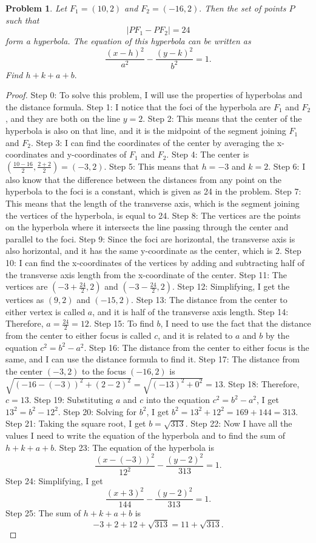\documentclass{article}
\newtheorem{theorem}{Problem}
\begin{document}
\begin{theorem}
Let $F_1 = (10,2)$ and $F_ 2= (-16,2).$ Then the set of points $P$ such that\[|PF_1 - PF_2| = 24\]form a hyperbola. The equation of this hyperbola can be written as\[\frac{(x - h)^2}{a^2} - \frac{(y - k)^2}{b^2} = 1.\]Find $h + k + a + b.$
\end{theorem}

\begin{proof}
Step 0: To solve this problem, I will use the properties of hyperbolas and the distance formula.
Step 1: I notice that the foci of the hyperbola are $F_1$ and $F_2$, and they are both on the line $y = 2.$
Step 2: This means that the center of the hyperbola is also on that line, and it is the midpoint of the segment joining $F_1$ and $F_2.$
Step 3: I can find the coordinates of the center by averaging the x-coordinates and y-coordinates of $F_1$ and $F_2.$
Step 4: The center is $(\frac{10 - 16}{2}, \frac{2 + 2}{2}) = (-3, 2).$
Step 5: This means that $h = -3$ and $k = 2.$
Step 6: I also know that the difference between the distances from any point on the hyperbola to the foci is a constant, which is given as 24 in the problem.
Step 7: This means that the length of the transverse axis, which is the segment joining the vertices of the hyperbola, is equal to 24.
Step 8: The vertices are the points on the hyperbola where it intersects the line passing through the center and parallel to the foci.
Step 9: Since the foci are horizontal, the transverse axis is also horizontal, and it has the same y-coordinate as the center, which is 2.
Step 10: I can find the x-coordinates of the vertices by adding and subtracting half of the transverse axis length from the x-coordinate of the center.
Step 11: The vertices are $(-3 + \frac{24}{2}, 2)$ and $(-3 - \frac{24}{2}, 2).$
Step 12: Simplifying, I get the vertices as $(9, 2)$ and $(-15, 2).$
Step 13: The distance from the center to either vertex is called $a$, and it is half of the transverse axis length.
Step 14: Therefore, $a = \frac{24}{2} = 12.$
Step 15: To find $b$, I need to use the fact that the distance from the center to either focus is called $c$, and it is related to $a$ and $b$ by the equation $c^2 = b^2 - a^2.$
Step 16: The distance from the center to either focus is the same, and I can use the distance formula to find it.
Step 17: The distance from the center $(-3, 2)$ to the focus $(-16, 2)$ is $\sqrt{(-16 - (-3))^2 + (2 - 2)^2} = \sqrt{(-13)^2 + 0^2} = 13.$
Step 18: Therefore, $c = 13.$
Step 19: Substituting $a$ and $c$ into the equation $c^2 = b^2 - a^2$, I get $13^2 = b^2 - 12^2.$
Step 20: Solving for $b^2$, I get $b^2 = 13^2 + 12^2 = 169 + 144 = 313.$
Step 21: Taking the square root, I get $b = \sqrt{313}.$
Step 22: Now I have all the values I need to write the equation of the hyperbola and to find the sum of $h + k + a + b.$
Step 23: The equation of the hyperbola is\[\frac{(x - (-3))^2}{12^2} - \frac{(y - 2)^2}{313} = 1.\]
Step 24: Simplifying, I get\[\frac{(x + 3)^2}{144} - \frac{(y - 2)^2}{313} = 1.\]
Step 25: The sum of $h + k + a + b$ is\[-3 + 2 + 12 + \sqrt{313} = 11 + \sqrt{313}.\]
\end{proof}
\end{document}

